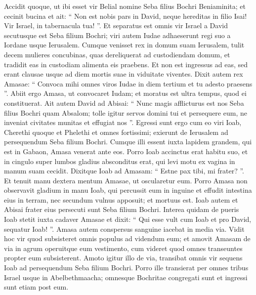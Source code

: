 \begin{biblechapter}
\begin{biblechapter}
\begin{biblechapter}
\begin{biblechapter}
\begin{biblechapter}
\begin{biblechapter}
\begin{biblechapter}
\begin{biblechapter}
\begin{biblechapter}
\begin{biblechapter}
\begin{biblechapter}
\begin{biblechapter}
\begin{biblechapter}
\begin{biblechapter}
\begin{biblechapter}
\begin{biblechapter}
\begin{biblechapter}
\begin{biblechapter}
\begin{biblechapter}
\begin{biblechapter}
\verse Accidit quoque, ut ibi esset vir Belial nomine Seba filius Bochri Beniaminita; et cecinit bucina et ait:
 “ Non est nobis pars in David,
 neque hereditas in filio Isai!
 Vir Israel, in tabernacula tua! ”.
 \verse Et separatus est omnis vir Israel a David secutusque est Seba filium Bochri; viri autem Iudae adhaeserunt regi suo a Iordane usque Ierusalem.
 \verse Cumque venisset rex in domum suam Ierusalem, tulit decem mulieres concubinas, quas dereliquerat ad custodiendam domum, et tradidit eas in custodiam alimenta eis praebens. Et non est ingressus ad eas, sed erant clausae usque ad diem mortis suae in viduitate viventes.
 \verse Dixit autem rex Amasae: “ Convoca mihi omnes viros Iudae in diem tertium et tu adesto praesens ”. 
\verse Abiit ergo Amasa, ut convocaret Iudam; et moratus est ultra tempus, quod ei constituerat. 
\verse Ait autem David ad Abisai: “ Nunc magis afflicturus est nos Seba filius Bochri quam Absalom; tolle igitur servos domini tui et persequere eum, ne inveniat civitates munitas et effugiat nos ”. 
 \verse Egressi sunt ergo cum eo viri Ioab, Cherethi quoque et Phelethi et omnes fortissimi; exierunt de Ierusalem ad persequendum Seba filium Bochri.
 \verse Cumque illi essent iuxta lapidem grandem, qui est in Gabaon, Amasa venerat ante eos. Porro Ioab accinctus erat habitu suo, et in cingulo super lumbos gladius absconditus erat, qui levi motu ex vagina in manum suam cecidit. 
\verse Dixitque Ioab ad Amasam: “ Estne pax tibi, mi frater? ”. Et tenuit manu dextera mentum Amasae, ut oscularetur eum. 
\verse Porro Amasa non observavit gladium in manu Ioab, qui percussit eum in inguine et effudit intestina eius in terram, nec secundum vulnus apposuit; et mortuus est. Ioab autem et Abisai frater eius persecuti sunt Seba filium Bochri. 
\verse Interea quidam de pueris Ioab stetit iuxta cadaver Amasae et dixit: “ Qui esse vult cum Ioab et pro David, sequatur Ioab! ”. 
\verse Amasa autem conspersus sanguine iacebat in media via. Vidit hoc vir quod subsisteret omnis populus ad videndum eum; et amovit Amasam de via in agrum operuitque eum vestimento, cum videret quod omnes transeuntes propter eum subsisterent. 
\verse Amoto igitur illo de via, transibat omnis vir sequens Ioab ad persequendum Seba filium Bochri.
 \verse Porro ille transierat per omnes tribus Israel usque in Abelbethmaacha; omnesque Bochritae congregati sunt et ingressi sunt etiam post eum. 

\end{biblechapter}
\end{biblechapter}
\end{biblechapter}
\end{biblechapter}
\end{biblechapter}
\end{biblechapter}
\end{biblechapter}
\end{biblechapter}
\end{biblechapter}
\end{biblechapter}
\end{biblechapter}
\end{biblechapter}
\end{biblechapter}
\end{biblechapter}
\end{biblechapter}
\end{biblechapter}
\end{biblechapter}
\end{biblechapter}
\end{biblechapter}
\end{biblechapter}
